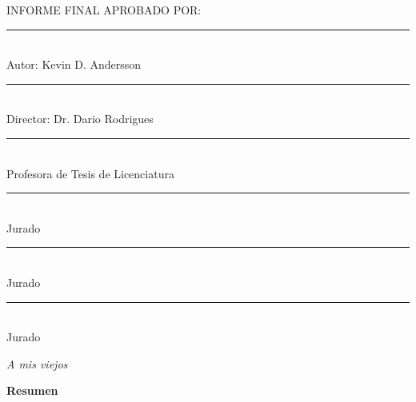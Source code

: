 \documentclass[a4paper,12pt]{report} %
\begin{document}
INFORME FINAL APROBADO POR:
\vfill
\begin{multicols}{2}    
\rule[0pt]{2.5in}{0.5pt}\\
Autor: Kevin D. Andersson
\vspace{3em}

\rule[0pt]{2.5in}{0.5pt}\\
Director: Dr. Dario Rodrigues
\vspace{3em}
   
\rule[0pt]{2.5in}{0.5pt}\\
Profesora de Tesis de Licenciatura
    
\columnbreak
\rule[0pt]{2.5in}{0.5pt}\\
Jurado 
\vspace{3em}
    
\rule[0pt]{2.5in}{0.5pt}\\
Jurado 
\vspace{3em}
    
\rule[0pt]{2.5in}{0.5pt}\\
Jurado 
\end{multicols}  
\newpage
\thispagestyle{empty} \mbox{}
\thispagestyle{empty}

\newpage
\thispagestyle{empty}
 \vspace*{150pt}
\begin{flushright}
\textit{A mis viejos}
\end{flushright}
\newpage
\thispagestyle{empty} \mbox{}
\thispagestyle{empty}


\newpage
\thispagestyle{empty}
\begin{center}\large{\textbf{Resumen}}\end{center}


\newpage
\thispagestyle{empty} \mbox{}
\thispagestyle{empty}

\newpage
{} %
\setcounter{page}{1}  %
\tableofcontents %
\newpage
\thispagestyle{empty} \mbox{}
\thispagestyle{empty}
\end{document}
